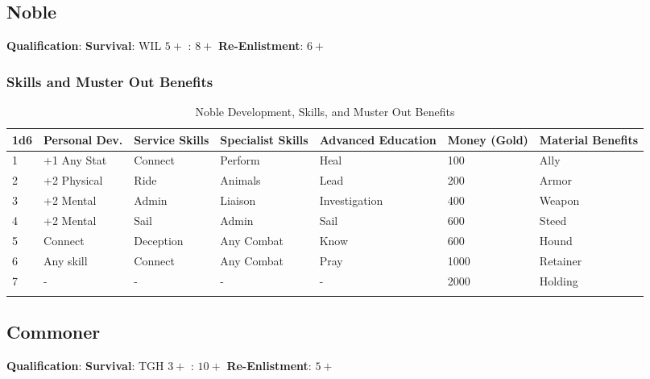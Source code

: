 \documentclass[itdr/core]{subfiles}
\begin{document}
\subsection{Noble}
\textbf{Qualification}: 
\textbf{Survival}: WIL $5+$
:  $8+$
\textbf{Re-Enlistment}: $6+$ 
\subsubsection{Skills and Muster Out Benefits}
\begin{longtable}{p{} p{} p{} p{} p{} p{} p{}}
\hline
\textbf{1d6} & \textbf{Personal Dev.} & \textbf{Service Skills} & \textbf{Specialist Skills} & \textbf{Advanced Education} & \textbf{Money (Gold)} & \textbf{Material Benefits} \\
\hline
1 & +1 Any Stat & Connect & Perform & Heal & 100 & Ally \\
2 & +2 Physical & Ride & Animals & Lead & 200 & Armor \\
3 & +2 Mental & Admin & Liaison & Investigation & 400 & Weapon \\
4 & +2 Mental & Sail & Admin & Sail & 600 & Steed \\
5 & Connect & Deception & Any Combat & Know & 600 & Hound \\
6 & Any skill & Connect & Any Combat & Pray & 1000 & Retainer \\
7 & - & - & - & - & 2000 & Holding \\
\hline
\caption{Noble Development, Skills, and Muster Out Benefits}
\end{longtable}
\subsection{Commoner}
\textbf{Qualification}: 
\textbf{Survival}: TGH $3+$
:  $10+$
\textbf{Re-Enlistment}: $5+$
\end{document}
